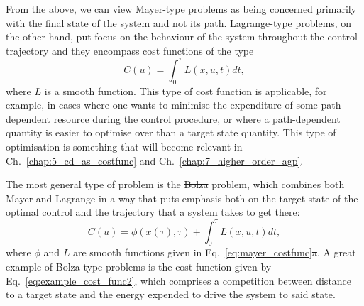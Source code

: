 \documentclass[a4paper,oneside,11pt]{book}
\providecommand{\DIFaddtex}[1]{{\protect\color{blue}\uwave{#1}}} %
\providecommand{\DIFdeltex}[1]{{\protect\color{red}\sout{#1}}}                      %
\providecommand{\DIFaddbegin}{} %
\providecommand{\DIFaddend}{} %
\providecommand{\DIFdelbegin}{} %
\providecommand{\DIFdelend}{} %
\providecommand{\DIFadd}[1]{\texorpdfstring{\DIFaddtex{#1}}{#1}} %
\providecommand{\DIFdel}[1]{\texorpdfstring{\DIFdeltex{#1}}{}} %
\newcommand{\DIFscaledelfig}{0.5}
\newlength{\DIFdelgraphicswidth} %
\newlength{\DIFdelgraphicsheight} %
\newcommand{\DIFaddincludegraphics}[2][]{{\color{blue}\fbox{\DIFOincludegraphics[#1]{#2}}}} %
\newcommand{\DIFdelincludegraphics}[2][]{%
\sbox{\DIFdelgraphicsbox}{\DIFOincludegraphics[#1]{#2}}%
\settoboxwidth{\DIFdelgraphicswidth}{\DIFdelgraphicsbox} %
\settoboxtotalheight{\DIFdelgraphicsheight}{\DIFdelgraphicsbox} %
\scalebox{\DIFscaledelfig}{%
\parbox[b]{\DIFdelgraphicswidth}{\usebox{\DIFdelgraphicsbox}\\[-\baselineskip] \rule{\DIFdelgraphicswidth}{0em}}\llap{\resizebox{\DIFdelgraphicswidth}{\DIFdelgraphicsheight}{%
\setlength{\unitlength}{\DIFdelgraphicswidth}%
\begin{picture}(1,1)%
\thicklines\linethickness{2pt} %
{\color[rgb]{1,0,0}\put(0,0){\framebox(1,1){}}}%
{\color[rgb]{1,0,0}\put(0,0){\line( 1,1){1}}}%
{\color[rgb]{1,0,0}\put(0,1){\line(1,-1){1}}}%
\end{picture}%
}\hspace*{3pt}}} %
} %
\DeclareRobustCommand{\DIFaddbegin}{\DIFOaddbegin \let\includegraphics\DIFaddincludegraphics} %
\DeclareRobustCommand{\DIFaddend}{\DIFOaddend \let\includegraphics\DIFOincludegraphics} %
\DeclareRobustCommand{\DIFdelbegin}{\DIFOdelbegin \let\includegraphics\DIFdelincludegraphics} %
\DeclareRobustCommand{\DIFdelend}{\DIFOaddend \let\includegraphics\DIFOincludegraphics} %
\begin{document}
From the above, we can view Mayer-type problems as being concerned primarily with the final state of the system and not its path. Lagrange-type problems, on the other hand, put focus on the behaviour of the system throughout the control trajectory and they encompass cost functions of the type
\begin{equation}\label{eq:lagrange_type_costfunc}
    C(u) = \int_0^{\tau} L(x, u, t) dt,
\end{equation}
where $L$ is a smooth function. This type of cost function is applicable, for example, in cases where one wants to minimise the expenditure of some path-dependent resource during the control procedure, or where a path-dependent quantity is easier to optimise over than a target state quantity. This type of optimisation is something that will become relevant in Ch.~\ref{chap:5_cd_as_costfunc} and Ch.~\ref{chap:7_higher_order_agp}. 

The most general type of problem is the \DIFdelbegin \DIFdel{Bolza }\DIFdelend \DIFaddbegin \DIFadd{Bolza-type }\DIFaddend problem, which combines both Mayer and Lagrange in a way that puts emphasis both on the target state of the optimal control and the trajectory that a system takes to get there:
\begin{equation}\label{eq:bolza_tyoe_costfunc}
    C(u) = \phi(x(\tau), \tau) + \int_0^{\tau} L(x, u, t) dt,
\end{equation}
where $\phi$ and $L$ are smooth functions given in Eq.~\eqref{eq:mayer_costfunc}\DIFdelbegin \DIFdel{a}\DIFdelend . A great example of Bolza-type problems is the cost function given by Eq.~\eqref{eq:example_cost_func2}, which comprises a competition between distance to a target state and the energy expended to drive the system to said state. 
\end{document}
